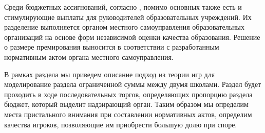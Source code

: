Среди бюджетных ассигнований, согласно , помимо основных также есть и стимулирующие выплаты для руководителей образовательных учреждений. Их разделение выполняется органом местного самоуправления образовательных организаций на основе форм независимой оценки качества образования.
Решение о размере премирования выносится в соответствии с разработанным нормативным актом органа местного самоуправления. 

В рамках раздела мы приведем описание подход из теории игр для моделирование раздела ограниченной суммы между двумя школами.
Раздел будет проходить в ходе последовательных торгов, определяющих пропорцию раздела бюджет, который выделит надзирающий орган.
Таким образом мы определим места пристального внимания при составлении нормативных актов, определим качества игроков, позволяющие им приобрести большую долю при споре.

